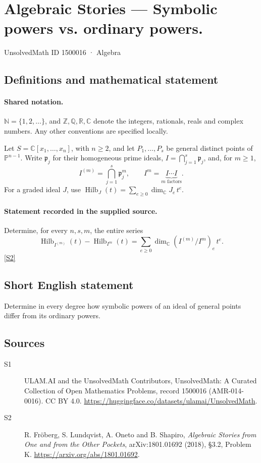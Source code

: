 \documentclass[11pt]{article}
\newcommand{\sref}[2]{\hyperlink{source:#1:#2}{[S#2]}}
\begin{document}
\setcounter{section}{1500015}
\section{Algebraic Stories — Symbolic powers vs. ordinary powers.}\label{1500016}
{\small\sffamily UnsolvedMath ID 1500016 · Algebra}
\subsection{Definitions and mathematical statement}

\paragraph{Shared notation.}$\mathbb N=\{1,2,\ldots\}$, and $\mathbb Z,\mathbb Q,\mathbb R,\mathbb C$ denote the integers, rationals, reals and complex numbers. Any other conventions are specified locally.


Let $S=\mathbb C[x_1,\ldots,x_n]$, with $n\geq2$, and let $P_1,\ldots,P_s$ be general distinct points of $\mathbb P^{n-1}$. Write $\mathfrak p_j$ for their homogeneous prime ideals, $I=\bigcap_{j=1}^s\mathfrak p_j$, and, for $m\geq1$,
\[I^{(m)}=\bigcap_{j=1}^s\mathfrak p_j^m,\qquad I^m=\underbrace{I\cdots I}_{m\text{ factors}}.
\]
For a graded ideal $J$, use $\operatorname{Hilb}_J(t)=\sum_{e\geq0}\dim_{\mathbb C}J_e\,t^e$.
\paragraph{Statement recorded in the supplied source.}
Determine, for every $n,s,m$, the entire series
\[\operatorname{Hilb}_{I^{(m)}}(t)-\operatorname{Hilb}_{I^m}(t)
 =\sum_{e\geq0}\dim_{\mathbb C}(I^{(m)}/I^m)_e\,t^e.
\] \sref{1500016}{2}
\subsection{Short English statement}
Determine in every degree how symbolic powers of an ideal of general points differ from its ordinary powers.
\subsection{Sources}
\begin{description}
\item[\hypertarget{source:1500016:1}{S1}] ULAM.AI and the UnsolvedMath Contributors, UnsolvedMath: A Curated Collection of Open Mathematics Problems, record 1500016 (AMR-014-0016). CC BY 4.0. \url{https://huggingface.co/datasets/ulamai/UnsolvedMath}.
\item[\hypertarget{source:1500016:2}{S2}] R. Fröberg, S. Lundqvist, A. Oneto and B. Shapiro, \emph{Algebraic Stories from One and from the Other Pockets}, arXiv:1801.01692 (2018), §3.2, Problem K. \url{https://arxiv.org/abs/1801.01692}.
\end{description}
\label{end:1500016}
\end{document}
